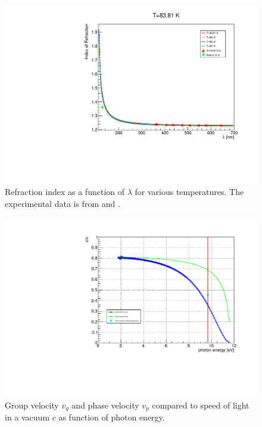 \documentclass{article}
\begin{document}
\begin{figure}[ht]
\begin{center}
\includegraphics[width=35.5pc]{sellmeier.pdf}
\end{center}
\caption{\label{fig:sellmeier}Refraction index as a function of $\lambda$ for various temperatures. The experimental data is from \cite{ref:Sinnock} and \cite{ref:vg}.}
\end{figure}
\begin{figure}[ht]
\begin{center}
\includegraphics[width=35.5pc]{velocity.pdf}
\end{center}
\caption{\label{fig:vg}Group velocity $v_g$ and phase velocity $v_p$ compared to speed of light in a vacuum $c$ as function of photon energy.}
\end{figure}
\end{document}
